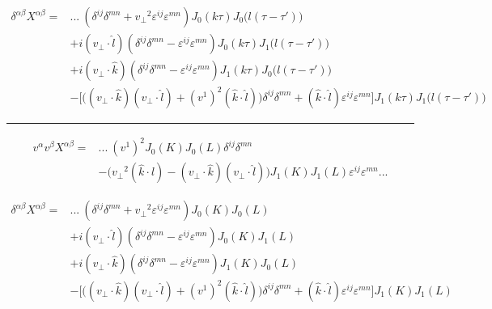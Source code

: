 \documentclass[12pt]{article}
\begin{document}
\begin{equation*}
\begin{split}
\delta^{\alpha \beta} X^{\alpha \beta}=& ...~ (\delta^{ij} \delta^{mn} + {v_\perp}^2 \varepsilon^{ij} \varepsilon^{mn}) J_0 (k \tau) J_0\big(l(\tau-\tau')\big) \\
& + i (v_\perp \cdot \hat{l}) (\delta^{ij} \delta^{mn} - \varepsilon^{ij} \varepsilon^{mn}) J_0 (k \tau) J_1\big(l(\tau-\tau')\big) \\
& + i (v_\perp \cdot \hat{k}) (\delta^{ij} \delta^{mn} - \varepsilon^{ij} \varepsilon^{mn}) J_1 (k \tau) J_0\big(l(\tau-\tau')\big) \\
& - \bigg[ \Big((v_\perp \cdot \hat{k}) (v_\perp \cdot \hat{l}) + (v^1)^2 (\hat{k} \cdot \hat{l}) \Big) \delta^{ij} \delta^{mn} + (\hat{k} \cdot \hat{l}) \varepsilon^{ij}\varepsilon^{mn} \bigg] J_1 (k \tau) J_1\big(l(\tau-\tau')\big) \end{split}
\end{equation*}

\hrule
\newpage
\begin{equation*}
\begin{split}
v^\alpha v^\beta X^{\alpha \beta} = & ...~ (v^1)^2 J_0 (K) J_0(L) \delta^{ij} \delta^{mn} \\
& - \Big( {v_\perp}^2 (\hat{k} \cdot \hat{l}) - (v_\perp \cdot \hat{k})(v_\perp \cdot \hat{l})\Big) J_1 (K) J_1(L) \varepsilon^{ij} \varepsilon^{mn} ...
\end{split}
\end{equation*}

\begin{equation*}
\begin{split}
\delta^{\alpha \beta} X^{\alpha \beta}=& ...~ (\delta^{ij} \delta^{mn} + {v_\perp}^2 \varepsilon^{ij} \varepsilon^{mn}) J_0 (K) J_0(L) \\
& + i (v_\perp \cdot \hat{l}) (\delta^{ij} \delta^{mn} - \varepsilon^{ij} \varepsilon^{mn}) J_0 (K) J_1(L) \\
& + i (v_\perp \cdot \hat{k}) (\delta^{ij} \delta^{mn} - \varepsilon^{ij} \varepsilon^{mn}) J_1 (K) J_0(L) \\
& - \bigg[ \Big((v_\perp \cdot \hat{k}) (v_\perp \cdot \hat{l}) + (v^1)^2 (\hat{k} \cdot \hat{l}) \Big) \delta^{ij} \delta^{mn} + (\hat{k} \cdot \hat{l}) \varepsilon^{ij}\varepsilon^{mn} \bigg] J_1 (K) J_1(L) \end{split}
\end{equation*}
\end{document}
